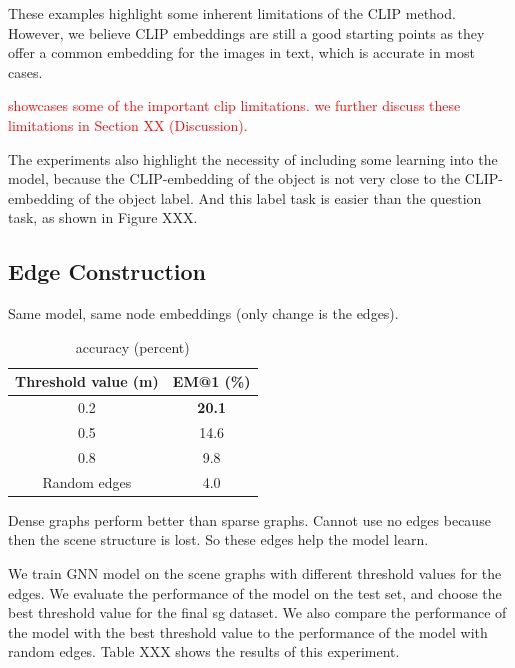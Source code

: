 These examples highlight some inherent limitations of the CLIP method. However, we believe CLIP embeddings are still a good starting points as they offer a common embedding for the images in text, which is accurate in most cases.

\textcolor{red}{showcases some of the important clip limitations. we further discuss these limitations in Section XX (Discussion). }

The experiments also highlight the necessity of including some learning into the model, because the CLIP-embedding of the object is not very close to the CLIP-embedding of the object label. And this label task is easier than the question task, as shown in Figure XXX.


\subsection{Edge Construction}
Same model, same node embeddings (only change is the edges).

\begin{table}[h!]
    \centering
    \caption{accuracy (percent)}
    \begin{tabular}{|c|c|}
    \hline
    \multicolumn{1}{|l|}{\textbf{Threshold value (m)}} & \textbf{EM@1 (\%)} \\ \hline
    0.2                                                & \textbf{20.1}      \\ \hline
    0.5                                                & 14.6               \\ \hline
    0.8                                                & 9.8                \\ \hline
    Random edges                                       & 4.0                \\ \hline
    \end{tabular}
    \end{table}

Dense graphs perform better than sparse graphs. Cannot use no edges because then the scene structure is lost.
So these edges help the model learn.

We train GNN model on the scene graphs with different threshold values for the edges. We evaluate the performance of the model on the test set, and choose the best threshold value for the final sg dataset. We also compare the performance of the model with the best threshold value to the performance of the model with random edges. Table XXX shows the results of this experiment.

